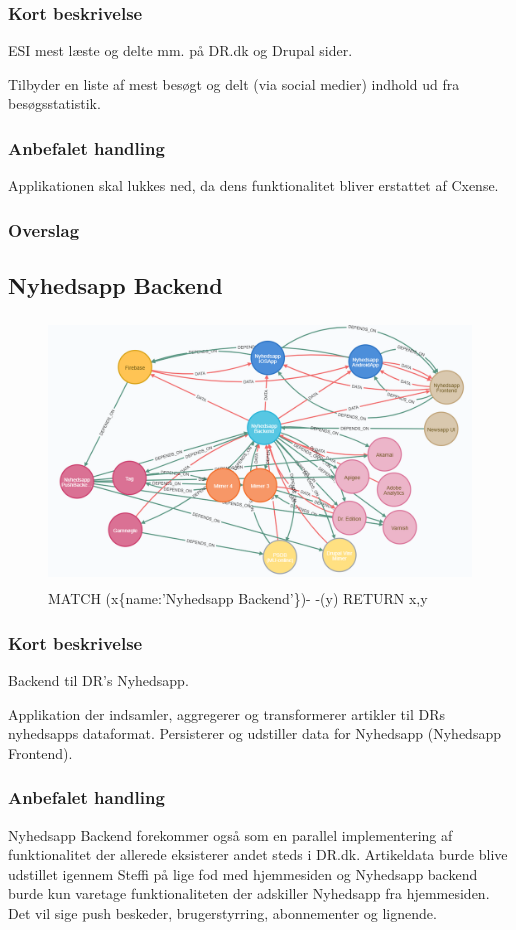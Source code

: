 \documentclass{article}
\begin{document}
\subsubsection{Kort beskrivelse}
ESI mest læste og delte mm. på DR.dk og Drupal sider.

Tilbyder en liste af mest besøgt og delt (via social medier) indhold ud fra besøgsstatistik.
\subsubsection{Anbefalet handling}
Applikationen skal lukkes ned, da dens funktionalitet bliver erstattet af Cxense.
\subsubsection{Overslag}


\subsection{Nyhedsapp Backend}
\begin{figure}[h]
\includegraphics[height=200pt]{NyhedsappBE.PNG}
\caption{MATCH (x\{name:'Nyhedsapp Backend'\})- -(y) RETURN x,y}
\end{figure}
\subsubsection{Kort beskrivelse}
Backend til DR's Nyhedsapp.	

Applikation der indsamler, aggregerer og transformerer artikler til DRs nyhedsapps dataformat. Persisterer og udstiller data for Nyhedsapp (Nyhedsapp Frontend).
\subsubsection{Anbefalet handling}
Nyhedsapp Backend forekommer også som en parallel implementering af funktionalitet der allerede eksisterer andet steds i DR.dk. 
Artikeldata burde blive udstillet igennem Steffi på lige fod med hjemmesiden og Nyhedsapp backend burde kun varetage funktionaliteten der adskiller Nyhedsapp fra hjemmesiden. Det vil sige push beskeder, brugerstyrring, abonnementer og lignende. 
\end{document}
